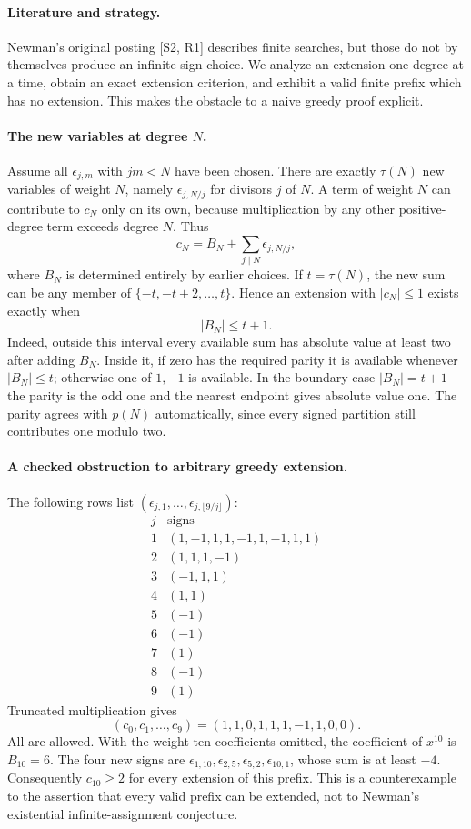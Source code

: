 \documentclass[11pt,a4paper]{article}
\begin{document}
\paragraph{Literature and strategy.}
Newman's original posting [S2, R1] describes finite searches, but those
do not by themselves produce an infinite sign choice. We analyze an
extension one degree at a time, obtain an exact extension criterion,
and exhibit a valid finite prefix which has no extension. This makes
the obstacle to a naive greedy proof explicit.

\paragraph{The new variables at degree $N$.}
Assume all $\epsilon_{j,m}$ with $jm<N$ have been chosen. There are
exactly $\tau(N)$ new variables of weight $N$, namely
$\epsilon_{j,N/j}$ for divisors $j$ of $N$. A term of weight $N$
can contribute to $c_N$ only on its own, because multiplication by
any other positive-degree term exceeds degree $N$. Thus
\[
 c_N=B_N+\sum_{j\mid N}\epsilon_{j,N/j},
\]
where $B_N$ is determined entirely by earlier choices. If $t=\tau(N)$,
the new sum can be any member of $\{-t,-t+2,\ldots,t\}$. Hence an
extension with $|c_N|\le1$ exists exactly when
\[
 |B_N|\le t+1.
\]
Indeed, outside this interval every available sum has absolute value
at least two after adding $B_N$. Inside it, if zero has the required
parity it is available whenever $|B_N|\le t$; otherwise one of $1,-1$
is available. In the boundary case $|B_N|=t+1$ the parity is the
odd one and the nearest endpoint gives absolute value one.
The parity agrees with $p(N)$ automatically, since every signed
partition still contributes one modulo two.

\paragraph{A checked obstruction to arbitrary greedy extension.}
The following rows list $(\epsilon_{j,1},\ldots,
\epsilon_{j,\lfloor9/j\rfloor})$:
\[
\begin{array}{c|l}
j&\text{signs}\\ \hline
1&(1,-1,1,1,-1,1,-1,1,1)\\
2&(1,1,1,-1)\\
3&(-1,1,1)\\
4&(1,1)\\
5&(-1)\\6&(-1)\\7&(1)\\8&(-1)\\9&(1)
\end{array}
\]
Truncated multiplication gives
\[
 (c_0,c_1,\ldots,c_9)=(1,1,0,1,1,1,-1,1,0,0).
\]
All are allowed. With the weight-ten coefficients omitted, the
coefficient of $x^{10}$ is $B_{10}=6$. The four new signs are
$\epsilon_{1,10},\epsilon_{2,5},\epsilon_{5,2},\epsilon_{10,1}$,
whose sum is at least $-4$. Consequently $c_{10}\ge2$ for every
extension of this prefix. This is a counterexample to the assertion
that every valid prefix can be extended, not to Newman's existential
infinite-assignment conjecture.
\end{document}
